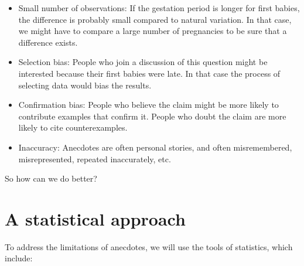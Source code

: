 \documentclass[12pt]{book}
\begin{document}
\begin{itemize}

\item Small number of observations: If the gestation period is longer
  for first babies, the difference is probably small compared to
  natural variation.  In that case, we might have to compare a large
  number of pregnancies to be sure that a difference exists.

\item Selection bias: People who join a discussion of this question
  might be interested because their first babies were late.  In that
  case the process of selecting data would bias the results.

\item Confirmation bias:  People who believe the claim might be more
  likely to contribute examples that confirm it.  People who doubt the
  claim are more likely to cite counterexamples.

\item Inaccuracy: Anecdotes are often personal stories, and often
  misremembered, misrepresented, repeated
  inaccurately, etc.

\end{itemize}

So how can we do better?


\section{A statistical approach}

To address the limitations of anecdotes, we will use the tools
of statistics, which include:
\end{document}
